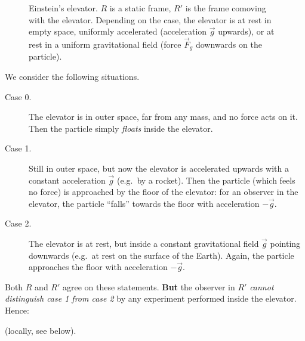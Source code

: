 \begin{figure}[ht]
\centering
{}
\caption{Einstein's elevator. $R$ is a static frame, $R'$ is the frame comoving with the elevator. Depending on the case, the elevator is at rest in empty space, uniformly accelerated (acceleration $\vec g$ upwards), or at rest in a uniform gravitational field (force $\vec F_g$ downwards on the particle).}
\label{fig:elevator}
\end{figure}

We consider the following situations.
\begin{description}
  \item[Case 0.] The elevator is in outer space, far from any mass, and no force acts on it. Then the particle simply \emph{floats} inside the elevator.
  \item[Case 1.] Still in outer space, but now the elevator is accelerated upwards with a constant acceleration $\vec g$ (e.g.\ by a rocket). Then the particle (which feels no force) is approached by the floor of the elevator: for an observer in the elevator, the particle ``falls'' towards the floor with acceleration $-\vec g$.
  \item[Case 2.] The elevator is at rest, but inside a constant gravitational field $\vec g$ pointing downwards (e.g.\ at rest on the surface of the Earth). Again, the particle approaches the floor with acceleration $-\vec g$.
\end{description}
Both $R$ and $R'$ agree on these statements. \textbf{But} the observer in $R'$ \emph{cannot distinguish case 1 from case 2} by any experiment performed inside the elevator. Hence:
\begin{center}
\end{center}
(locally, see below).

